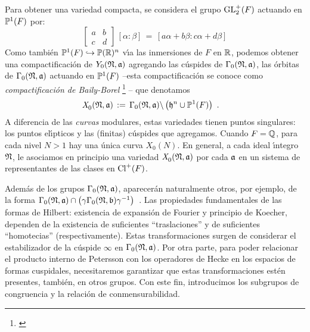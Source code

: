Para obtener una variedad compacta, se considera el grupo $\GLtp_{2}(F)$
actuando en $\bb{P}^{1}(F)$ por:
\begin{equation}
	\label{eq:accionenlascuspides}
	\begin{bmatrix} a & b \\ c & d \end{bmatrix}\,[\alpha:\beta]
		\,=\,[a\alpha+b\beta:c\alpha+d\beta]
\end{equation}
%
Como tambi\'{e}n $\bb{P}^{1}(F)\hookrightarrow\bb{P}(\bb{R})^{n}$ v\'{\i}a las
inmersiones de $F$ en $\bb{R}$, podemos obtener una compactificaci\'{o}n de
$Y_{0}(\frak{N},\frak{a})$ agregando las c\'{u}spides de
$\Gamma_{0}(\frak{N},\frak{a})$, las \'{o}rbitas de
$\Gamma_{0}(\frak{N},\frak{a})$ actuando en $\bb{P}^{1}(F)$ --esta
compactificaci\'{o}n se conoce como \emph{compactificaci\'{o}n de %
Baily-Borel}%
\footnote{\cite[Ch.~II, \S~7]{vanDerGeerSurfaces}}
-- que denotamos
\begin{align*}
	\shimura{\frak{N},\frak{a}} & \,:=\,
		\Gamma_{0}(\frak{N},\frak{a})\backslash
		\left(\hP^{n}\cup\bb{P}^{1}(F)\right)
	\text{ .}
\end{align*}
%
A diferencia de las \emph{curvas} modulares, estas variedades tienen
puntos singulares: los puntos el\'{\i}pticos y las (finitas) c\'{u}spides
que agregamos. Cuando $F=\bb{Q}$, para cada nivel $N>1$ hay una \'{u}nica
curva $X_{0}(N)$. En general, a cada ideal \'{\i}ntegro $\frak{N}$, le
asociamos en principio una variedad $\shimura{\frak{N},\frak{a}}$ por cada
$\frak{a}$ en un sistema de representantes de las clases en $\pClass{F}$.

Adem\'{a}s de los grupos $\Gamma_{0}(\frak{N},\frak{a})$, aparecer\'{a}n
naturalmente otros, por ejemplo, de la forma
\begin{math}
	\Gamma_{0}(\frak{N},\frak{a})\cap
		\big(\gamma\Gamma_{0}(\frak{N},\frak{b})\gamma^{-1}\big)
\end{math}~.
Las propiedades fundamentales de las formas de Hilbert: existencia
de expansi\'{o}n de Fourier y principio de Koecher, dependen de la existencia
de suficientes ``traslaciones'' y de suficientes ``homotecias''
(respectivamente). Estas transformaciones surgen de considerar el estabilizador
de la c\'{u}spide $\infty$ en $\Gamma_{0}(\frak{N},\frak{a})$. Por otra
parte, para poder relacionar el producto interno de Petersson con los
operadores de Hecke en los espacios de formas cuspidales, necesitaremos
garantizar que estas transformaciones est\'{e}n presentes, tambi\'{e}n, en
otros grupos. Con este fin, introducimos los subgrupos de congruencia y la
relaci\'{o}n de conmensurabilidad.

